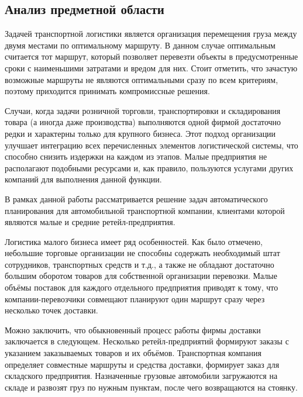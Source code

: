 \subsection{Анализ предметной области}
	Задачей транспортной логистики является организация перемещения груза между двумя местами по оптимальному маршруту\cite{subj:main}. В данном случае оптимальным считается тот маршрут, который позволяет перевезти объекты в предусмотренные сроки с наименьшими затратами и вредом для них. Стоит отметить, что зачастую возможные маршруты не являются оптимальными сразу по всем критериям, поэтому приходится принимать компромиссные решения.
	
	Случаи, когда задачи розничной торговли, транспортировки и складирования товара (а иногда даже производства) выполняются одной фирмой достаточно редки и характерны только для крупного бизнеса. Этот подход организации улучшает интеграцию всех перечисленных элементов логистической системы, что способно снизить издержки на каждом из этапов. Малые предприятия не располагают подобными ресурсами и, как правило, пользуются услугами других компаний для выполнения данной функции.  
	
	В рамках данной работы рассматривается решение задач автоматического планирования для автомобильной транспортной компании, клиентами которой являются малые и средние ретейл-предприятия.
	
	Логистика малого бизнеса имеет ряд особенностей\cite{subj:small_business}. Как было отмечено, небольшие торговые организации не способны содержать необходимый штат сотрудников, транспортных средств и т.д., а также не обладают достаточно большим оборотом товаров для собственной организации перевозки. Малые объёмы поставок для каждого отдельного предприятия приводят к тому, что компании-перевозчики совмещают планируют один маршрут сразу через несколько точек доставки.
	
	Можно заключить, что обыкновенный процесс работы фирмы доставки заключается в следующем. Несколько ретейл-предприятий формируют заказы с указанием заказываемых товаров и их объёмов. Транспортная компания определяет совместные маршруты и средства доставки, формирует заказ для складского предприятия. Назначенные грузовые автомобили загружаются на складе и развозят груз по нужным пунктам, после чего возвращаются на стоянку.

